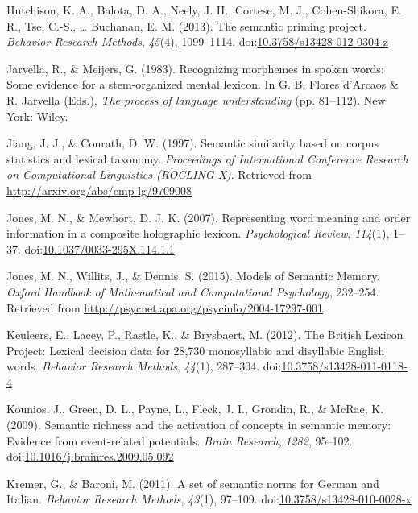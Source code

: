\documentclass[english,,man]{apa6}
\theoremstyle{definition}
\theoremstyle{definition}
\theoremstyle{definition}
\theoremstyle{remark}
\begin{document}
\hypertarget{ref-Hutchison2013}{}
Hutchison, K. A., Balota, D. A., Neely, J. H., Cortese, M. J.,
Cohen-Shikora, E. R., Tse, C.-S., \ldots{} Buchanan, E. M. (2013). The
semantic priming project. \emph{Behavior Research Methods},
\emph{45}(4), 1099--1114.
doi:\href{https://doi.org/10.3758/s13428-012-0304-z}{10.3758/s13428-012-0304-z}

\hypertarget{ref-Jarvella1983}{}
Jarvella, R., \& Meijers, G. (1983). Recognizing morphemes in spoken
words: Some evidence for a stem-organized mental lexicon. In G. B.
Flores d'Arcaos \& R. Jarvella (Eds.), \emph{The process of language
understanding} (pp. 81--112). New York: Wiley.

\hypertarget{ref-Jiang1997}{}
Jiang, J. J., \& Conrath, D. W. (1997). Semantic similarity based on
corpus statistics and lexical taxonomy. \emph{Proceedings of
International Conference Research on Computational Linguistics (ROCLING
X)}. Retrieved from \url{http://arxiv.org/abs/cmp-lg/9709008}

\hypertarget{ref-Jones2007}{}
Jones, M. N., \& Mewhort, D. J. K. (2007). Representing word meaning and
order information in a composite holographic lexicon.
\emph{Psychological Review}, \emph{114}(1), 1--37.
doi:\href{https://doi.org/10.1037/0033-295X.114.1.1}{10.1037/0033-295X.114.1.1}

\hypertarget{ref-Jones2015a}{}
Jones, M. N., Willits, J., \& Dennis, S. (2015). Models of Semantic
Memory. \emph{Oxford Handbook of Mathematical and Computational
Psychology}, 232--254. Retrieved from
\url{http://psycnet.apa.org/psycinfo/2004-17297-001}

\hypertarget{ref-Keuleers2012}{}
Keuleers, E., Lacey, P., Rastle, K., \& Brysbaert, M. (2012). The
British Lexicon Project: Lexical decision data for 28,730 monosyllabic
and disyllabic English words. \emph{Behavior Research Methods},
\emph{44}(1), 287--304.
doi:\href{https://doi.org/10.3758/s13428-011-0118-4}{10.3758/s13428-011-0118-4}

\hypertarget{ref-Kounios2009}{}
Kounios, J., Green, D. L., Payne, L., Fleck, J. I., Grondin, R., \&
McRae, K. (2009). Semantic richness and the activation of concepts in
semantic memory: Evidence from event-related potentials. \emph{Brain
Research}, \emph{1282}, 95--102.
doi:\href{https://doi.org/10.1016/j.brainres.2009.05.092}{10.1016/j.brainres.2009.05.092}

\hypertarget{ref-Kremer2011a}{}
Kremer, G., \& Baroni, M. (2011). A set of semantic norms for German and
Italian. \emph{Behavior Research Methods}, \emph{43}(1), 97--109.
doi:\href{https://doi.org/10.3758/s13428-010-0028-x}{10.3758/s13428-010-0028-x}
\end{document}
